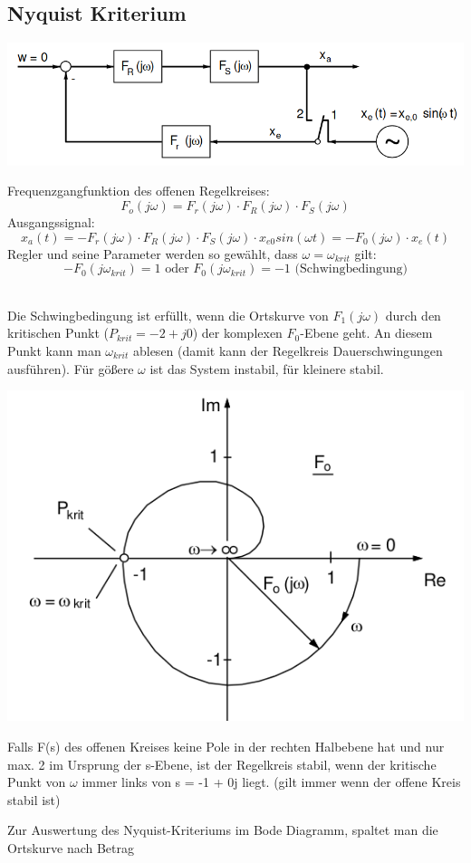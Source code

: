 \documentclass[10pt,a4paper]{article}
\begin{document}
\subsection{Nyquist Kriterium}
    \begin{center}
      \includegraphics[width=.45\textwidth]{Figures/Nyquist.png}
    \end{center}
    Frequenzgangfunktion des offenen Regelkreises:
    \[ F_o (j\omega) = F_r (j\omega) \cdot F_R (j\omega) \cdot F_S (j\omega)\]
    Ausgangssignal:
    \[ x_a(t)=-F_r (j\omega) \cdot F_R (j\omega) \cdot F_S (j\omega) \cdot x_{e0} sin(\omega t)=
    -F_0 (j\omega) \cdot x_e (t)\]
    Regler und seine Parameter werden so gewählt, dass $\omega = \omega_{krit}$ gilt:
    \[-F_0 (j\omega_{krit})=1 \text{ oder } F_0 (j\omega_{krit})=-1 \text{ (Schwingbedingung)}\]\
    \begin{mdframed}[style=exercise]
        Die Schwingbedingung ist erfüllt, wenn die Ortskurve von $F_1 (j\omega)$ durch den kritischen
        Punkt ($P_{krit} = -2+j0$) der komplexen $F_0$-Ebene geht. An diesem Punkt kann man
        $\omega_{krit}$ ablesen (damit kann der Regelkreis Dauerschwingungen ausführen).
        Für gößere $\omega$ ist das System instabil, für kleinere stabil.



    \end{mdframed}
    \includegraphics[width=.45\textwidth]{Figures/Nyquistwkrit.png}
    \begin{mdframed}[style=exercise]
        Falls F(s) des offenen Kreises keine Pole in der rechten Halbebene hat und nur max. 2 im Ursprung der s-Ebene,
        ist der Regelkreis stabil, wenn der kritische Punkt von $\omega$ immer links von
        s = -1 + 0j liegt. (gilt immer wenn der offene Kreis stabil ist)
    \end{mdframed}
    Zur Auswertung des Nyquist-Kriteriums im Bode Diagramm, spaltet man die Ortskurve nach Betrag
\end{document}
